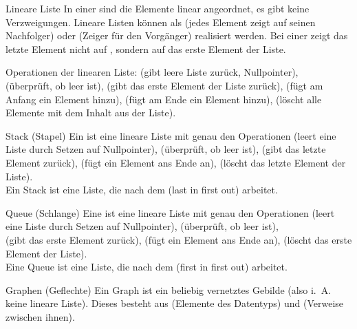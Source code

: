 \begin{Def}{Lineare Liste}
    In einer  sind die Elemente linear angeordnet, es
    gibt keine Verzweigungen. Lineare Listen können als 
    (jedes Element zeigt auf seinen Nachfolger) oder  (Zeiger für den Vorgänger) realisiert werden.
    Bei einer  zeigt das letzte Element nicht auf
    , sondern auf das erste Element der Liste.

    Operationen der linearen Liste:
     (gibt leere Liste zurück, Nullpointer),\\
     (überprüft, ob  leer ist),
     (gibt das erste Element der Liste zurück),
     (fügt am Anfang ein Element hinzu),
     (fügt am Ende ein Element hinzu),
     (löscht alle Elemente mit dem Inhalt aus der Liste).
\end{Def}

\begin{Def}{Stack (Stapel)}
    Ein  ist eine lineare Liste mit genau den Operationen
     (leert eine Liste durch Setzen auf Nullpointer),
     (überprüft, ob  leer ist),
     (gibt das letzte Element zurück),
     (fügt ein Element ans Ende an),
     (löscht das letzte Element der Liste). \\
    Ein Stack ist eine Liste, die nach dem 
    (last in first out) arbeitet.
\end{Def}

\begin{Def}{Queue (Schlange)}
    Eine  ist eine lineare Liste mit genau den Operationen
     (leert eine Liste durch Setzen auf Nullpointer),
     (überprüft, ob  leer ist), \\
     (gibt das erste Element zurück),
     (fügt ein Element ans Ende an),
     (löscht das erste Element der Liste). \\
    Eine Queue ist eine Liste, die nach dem 
    (first in first out) arbeitet.
\end{Def}

\begin{Def}{Graphen (Geflechte)}
    Ein Graph ist ein beliebig vernetztes Gebilde (also i.~A. keine lineare
    Liste). Dieses besteht aus  (Elemente des Datentyps) und
     (Verweise zwischen ihnen).
\end{Def}

